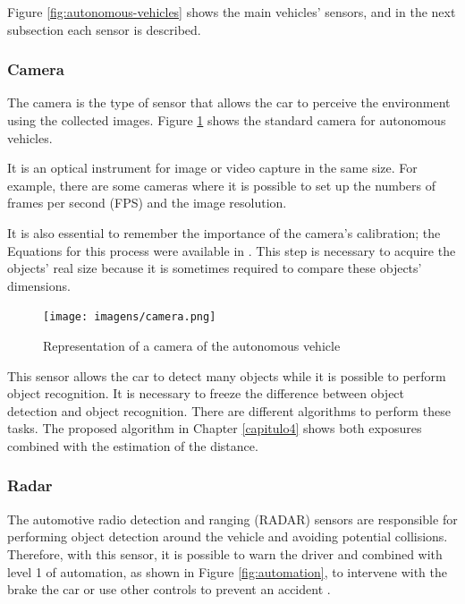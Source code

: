 Figure \ref{fig:autonomous-vehicles} shows the main vehicles' sensors, and in the next subsection each sensor is described. 


\subsubsection{Camera}
The camera is the type of sensor that allows the car to perceive the environment using the collected images. Figure \ref{fig:camera} shows the standard camera for autonomous vehicles.

It is an optical instrument for image or video capture in the same size. For example, there are some cameras where it is possible to set up the numbers of frames per second (FPS) and the image resolution. 

It is also essential to remember the importance of the camera's calibration; the Equations for this process were available in \cite{888718}. This step is necessary to acquire the objects' real size because it is sometimes required to compare these objects' dimensions. 

\begin{figure}[H]
\centering
\texttt{[image: imagens/camera.png]}
\caption{Representation of a camera of the autonomous vehicle \cite{site-camera}}
\label{fig:camera}
\end{figure}

This sensor allows the car to detect many objects while it is possible to perform object recognition. It is necessary to freeze the difference between object detection and object recognition. There are different algorithms to perform these tasks. The proposed algorithm in Chapter \ref{capitulo4} shows both exposures combined with the estimation of the distance. 

\subsubsection{Radar}

The automotive radio detection and ranging (RADAR) sensors are responsible for performing object detection around the vehicle and avoiding potential collisions. Therefore, with this sensor, it is possible to warn the driver and combined with level 1 of automation, as shown in Figure \ref{fig:automation}, to intervene with the brake the car or use other controls to prevent an accident \cite{ariyur2006collision}.

